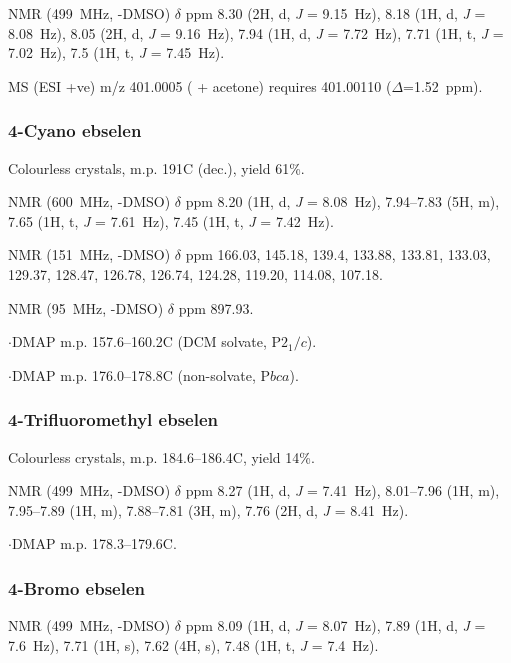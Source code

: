 \begin{refsection}
 NMR (499~MHz, -DMSO) $ \delta $ ppm 8.30 (2H, d, \textit{J} = 9.15~Hz), 8.18 (1H, d, \textit{J} = 8.08~Hz), 8.05 (2H, d, \textit{J} = 9.16~Hz), 7.94 (1H, d, \textit{J} = 7.72~Hz), 7.71 (1H, t, \textit{J} = 7.02~Hz), 7.5 (1H, t, \textit{J} = 7.45~Hz).

MS (ESI +ve) m/z 401.0005 ( + acetone)  requires 401.00110 ($ \Delta $=1.52~ppm).

\subsubsection{4-Cyano ebselen }
Colourless crystals, m.p. 191\degree{}C (dec.), yield 61\%.

 NMR (600~MHz, -DMSO) $ \delta $ ppm 8.20 (1H, d, \textit{J} = 8.08~Hz), 7.94--7.83 (5H, m), 7.65 (1H, t, \textit{J} = 7.61~Hz), 7.45 (1H, t, \textit{J} = 7.42~Hz).

 NMR (151~MHz, -DMSO) $ \delta $ ppm 166.03, 145.18, 139.4, 133.88, 133.81, 133.03, 129.37, 128.47, 126.78, 126.74, 124.28, 119.20, 114.08, 107.18.

 NMR (95~MHz, -DMSO) $ \delta $ ppm 897.93.

$ \cdot $DMAP m.p. 157.6--160.2\degree{}C (DCM solvate, P$2_1/c$).

$ \cdot $DMAP m.p. 176.0--178.8\degree{}C (non-solvate, P$bca$).


\subsubsection{4-Trifluoromethyl ebselen }
Colourless crystals, m.p. 184.6--186.4\degree{}C, yield 14\%.

 NMR (499~MHz, -DMSO) $ \delta $ ppm 8.27 (1H, d, \textit{J} = 7.41~Hz), 8.01--7.96 (1H, m), 7.95--7.89 (1H, m), 7.88--7.81 (3H, m), 7.76 (2H, d, \textit{J} = 8.41~Hz).

$ \cdot $DMAP m.p. 178.3--179.6\degree{}C.


\subsubsection{4-Bromo ebselen } 

 NMR (499~MHz, -DMSO) $ \delta $ ppm 8.09 (1H, d, \textit{J} = 8.07~Hz), 7.89 (1H, d, \textit{J} = 7.6~Hz), 7.71 (1H, s), 7.62 (4H, s), 7.48 (1H, t, \textit{J} = 7.4~Hz).


\end{refsection}

